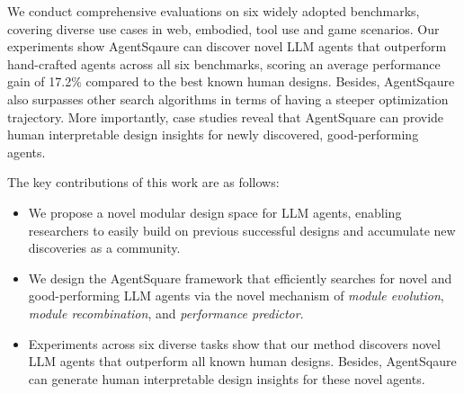 We conduct comprehensive evaluations on six widely adopted benchmarks, covering diverse use cases in web, embodied, tool use and game scenarios. Our experiments show AgentSqaure can discover novel LLM agents that outperform hand-crafted agents across all six benchmarks, scoring an average performance gain of 17.2\% compared to the best known human designs. Besides, AgentSqaure also surpasses other search algorithms in terms of having a steeper optimization trajectory. More importantly, case studies reveal that AgentSquare can provide human interpretable design insights for newly discovered, good-performing agents.

The key contributions of this work are as follows:

\begin{itemize}
    \item We propose a novel modular design space for LLM agents, enabling researchers to easily build on previous successful designs and accumulate new discoveries as a community.
    \item We design the AgentSquare framework that efficiently searches for novel and good-performing LLM agents via the novel mechanism of \emph{module evolution}, \emph{module recombination}, and \emph{performance predictor}.  
    \item Experiments across six diverse tasks show that our method discovers novel LLM agents that outperform all known human designs. Besides, AgentSqaure can generate human interpretable design insights for these novel agents. 
\end{itemize}

